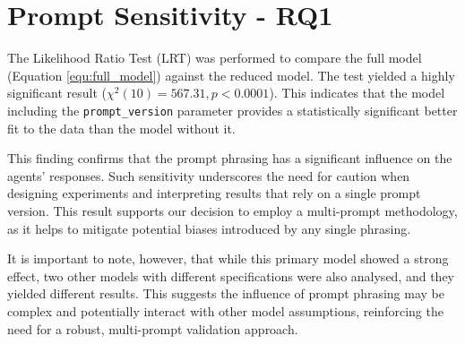 \section{Prompt Sensitivity - RQ1}


The Likelihood Ratio Test (LRT) was performed to compare the full model (Equation \ref{equ:full_model}) against the reduced model. The test yielded a highly significant result ($\chi^2(10) = 567.31, p < 0.0001$). This indicates that the model including the \texttt{prompt\_version} parameter provides a statistically significant better fit to the data than the model without it.

This finding confirms that the prompt phrasing has a significant influence on the agents' responses. Such sensitivity underscores the need for caution when designing experiments and interpreting results that rely on a single prompt version. This result supports our decision to employ a multi-prompt methodology, as it helps to mitigate potential biases introduced by any single phrasing.

It is important to note, however, that while this primary model showed a strong effect, two other models with different specifications were also analysed, and they yielded different results. This suggests the influence of prompt phrasing may be complex and potentially interact with other model assumptions, reinforcing the need for a robust, multi-prompt validation approach.

